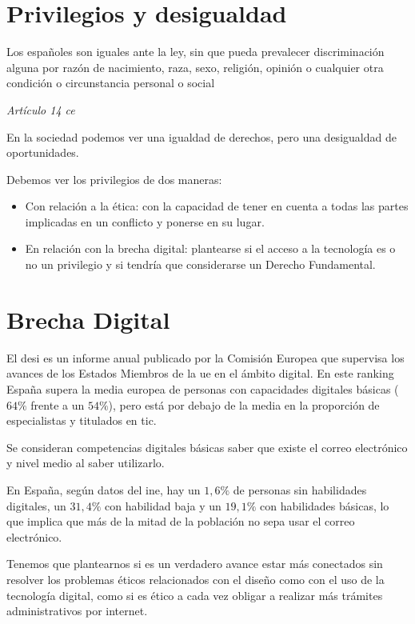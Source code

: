\section{Privilegios y desigualdad}

\epigraph{Los españoles son iguales ante la ley, sin que pueda prevalecer discriminación alguna por razón de nacimiento, raza, sexo, religión, opinión o cualquier otra condición o circunstancia personal o social}{\textit{Artículo 14 \gls{ce}}}

En la sociedad podemos ver una igualdad de derechos, pero una desigualdad de oportunidades.

Debemos ver los privilegios de dos maneras:
\begin{itemize}
    \item Con relación a la ética: con la capacidad de tener en cuenta a todas las partes implicadas en un conflicto y ponerse en su lugar.
    \item En relación con la brecha digital: plantearse si el acceso a la tecnología es o no un privilegio y si tendría que considerarse un Derecho Fundamental.
\end{itemize}

\section{Brecha Digital}

El \gls{desi} es un informe anual publicado por la Comisión Europea que supervisa los avances de los Estados Miembros de la \gls{ue} en el ámbito digital. En este ranking España supera la media europea de personas con capacidades digitales básicas ($64\%$ frente a un $54\%$), pero está por debajo de la media en la proporción de especialistas y titulados en \gls{tic}.

Se consideran competencias digitales básicas saber que existe el correo electrónico y nivel medio al saber utilizarlo.


En España, según datos del \gls{ine}, hay un $1,6\%$ de personas sin habilidades digitales, un $31,4\%$ con habilidad baja y un $19,1\%$ con habilidades básicas, lo que implica que más de la mitad de la población no sepa usar el correo electrónico.

Tenemos que plantearnos si es un verdadero avance estar más conectados sin resolver los problemas éticos relacionados con el diseño como con el uso de la tecnología digital, como si es ético a cada vez obligar a realizar más trámites administrativos por internet.

